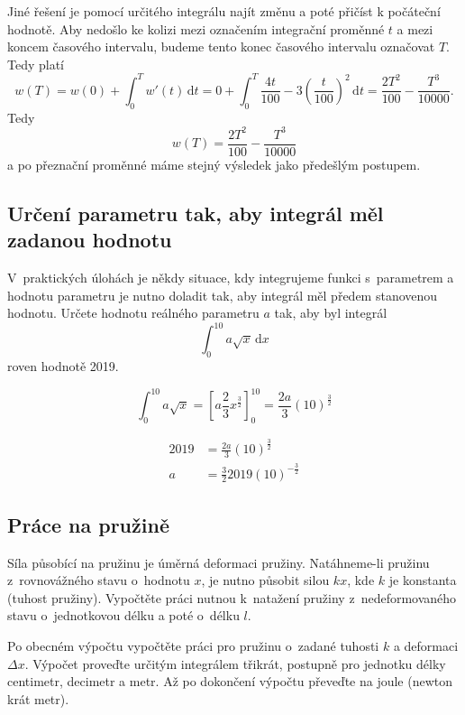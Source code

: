 Jiné řešení je pomocí určitého integrálu najít změnu a poté přičíst k počáteční hodnotě. Aby nedošlo ke kolizi mezi označením integrační proměnné $t$ a mezi koncem časového intervalu, budeme tento konec časového intervalu označovat $T$. Tedy platí
\begin{equation*}
  w(T)=w(0)+\int_0^T w'(t)\,\mathrm dt=
  0+ \int_0^T \frac{4t}{100}-3\left (\frac  t{100}\right)^2 \,\mathrm dt  =\frac {2T^2}{100}-\frac{T^3}{10000}.
\end{equation*}
Tedy
\begin{equation*}
  w(T)=\frac {2T^2}{100}-\frac{T^3}{10000}
\end{equation*}
a po přeznační proměnné máme stejný výsledek jako předešlým postupem.

\konec


\stranka

\subsection{Určení parametru tak, aby integrál měl zadanou hodnotu}
V praktických úlohách je někdy situace, kdy integrujeme funkci s parametrem a hodnotu parametru je nutno doladit tak, aby integrál měl
předem stanovenou hodnotu.  Určete hodnotu reálného parametru $a$ tak,
aby byl integrál $$\int_0^{10} a \sqrt x\,\mathrm dx$$ roven hodnotě
2019.

\reseni

$$\int _0^{10} a\sqrt x=\left[a\frac 23 x^{\frac 32}\right]_0^{10}=\frac {2a}{3}(10)^{\frac 32}$$

$$\begin{aligned}
  2019&=\frac {2a}{3}(10)^{\frac 32}\\
  a&=\frac 32 2019 (10)^{-\frac 32}\end{aligned}$$

\konec

\stranka

\subsection{Práce na pružině} Síla působící na pružinu je úměrná
deformaci pružiny. Natáhneme-li pružinu z rovnovážného stavu o hodnotu
$x$, je nutno působit silou $kx$, kde $k$ je konstanta (tuhost
pružiny). Vypočtěte práci nutnou k natažení pružiny z nedeformovaného
stavu o jednotkovou délku a poté o délku $l$.

Po obecném výpočtu vypočtěte práci pro pružinu o zadané tuhosti $k$ a
deformaci $\Delta x$. Výpočet proveďte určitým integrálem třikrát,
postupně pro jednotku délky centimetr, decimetr a metr. Až po
dokončení výpočtu převeďte na joule (newton krát metr).

